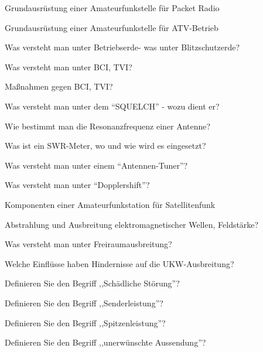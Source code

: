 \documentclass[avery5371,grid,frame,a4paper]{flashcards}
\newcommand\question[2]{
  \begin{flashcard}[{\chap} -- #1]{#2}\end{flashcard}
}
\begin{document}
\question{39}{Grundausrüstung einer Amateurfunkstelle für Packet Radio}
\question{40}{Grundausrüstung einer Amateurfunkstelle für ATV-Betrieb}
\question{41}{Was versteht man unter Betriebserde- was unter Blitzschutzerde?}
\question{42}{Was versteht man unter BCI, TVI?}
\question{43}{Maßnahmen gegen BCI, TVI?}
\question{44}{Was versteht man unter dem ``SQUELCH'' - wozu dient er?}
\question{45}{Wie bestimmt man die Resonanzfrequenz einer Antenne?}
\question{46}{Was ist ein SWR-Meter, wo und wie wird es eingesetzt?}
\question{47}{Was versteht man unter einem ``Antennen-Tuner''?}
\question{48}{Was versteht man unter ``Dopplershift''?}
\question{49}{Komponenten einer Amateurfunkstation für Satellitenfunk}
\question{50}{Abstrahlung und Ausbreitung elektromagnetischer Wellen, Feldstärke?}
\question{51}{Was versteht man unter Freiraumausbreitung?}
\question{52}{Welche Einflüsse haben Hindernisse auf die UKW-Ausbreitung?}
\question{53}{Definieren Sie den Begriff ,,Schädliche Störung''?}
\question{54}{Definieren Sie den Begriff ,,Senderleistung''?}
\question{55}{Definieren Sie den Begriff ,,Spitzenleistung''?}
\question{56}{Definieren Sie den Begriff ,,unerwünschte Aussendung''?}
\end{document}
